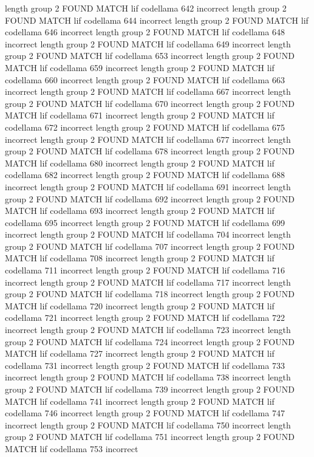 length group  2
FOUND MATCH lif codellama 642 incorrect
length group  2
FOUND MATCH lif codellama 644 incorrect
length group  2
FOUND MATCH lif codellama 646 incorrect
length group  2
FOUND MATCH lif codellama 648 incorrect
length group  2
FOUND MATCH lif codellama 649 incorrect
length group  2
FOUND MATCH lif codellama 653 incorrect
length group  2
FOUND MATCH lif codellama 659 incorrect
length group  2
FOUND MATCH lif codellama 660 incorrect
length group  2
FOUND MATCH lif codellama 663 incorrect
length group  2
FOUND MATCH lif codellama 667 incorrect
length group  2
FOUND MATCH lif codellama 670 incorrect
length group  2
FOUND MATCH lif codellama 671 incorrect
length group  2
FOUND MATCH lif codellama 672 incorrect
length group  2
FOUND MATCH lif codellama 675 incorrect
length group  2
FOUND MATCH lif codellama 677 incorrect
length group  2
FOUND MATCH lif codellama 678 incorrect
length group  2
FOUND MATCH lif codellama 680 incorrect
length group  2
FOUND MATCH lif codellama 682 incorrect
length group  2
FOUND MATCH lif codellama 688 incorrect
length group  2
FOUND MATCH lif codellama 691 incorrect
length group  2
FOUND MATCH lif codellama 692 incorrect
length group  2
FOUND MATCH lif codellama 693 incorrect
length group  2
FOUND MATCH lif codellama 695 incorrect
length group  2
FOUND MATCH lif codellama 699 incorrect
length group  2
FOUND MATCH lif codellama 704 incorrect
length group  2
FOUND MATCH lif codellama 707 incorrect
length group  2
FOUND MATCH lif codellama 708 incorrect
length group  2
FOUND MATCH lif codellama 711 incorrect
length group  2
FOUND MATCH lif codellama 716 incorrect
length group  2
FOUND MATCH lif codellama 717 incorrect
length group  2
FOUND MATCH lif codellama 718 incorrect
length group  2
FOUND MATCH lif codellama 720 incorrect
length group  2
FOUND MATCH lif codellama 721 incorrect
length group  2
FOUND MATCH lif codellama 722 incorrect
length group  2
FOUND MATCH lif codellama 723 incorrect
length group  2
FOUND MATCH lif codellama 724 incorrect
length group  2
FOUND MATCH lif codellama 727 incorrect
length group  2
FOUND MATCH lif codellama 731 incorrect
length group  2
FOUND MATCH lif codellama 733 incorrect
length group  2
FOUND MATCH lif codellama 738 incorrect
length group  2
FOUND MATCH lif codellama 739 incorrect
length group  2
FOUND MATCH lif codellama 741 incorrect
length group  2
FOUND MATCH lif codellama 746 incorrect
length group  2
FOUND MATCH lif codellama 747 incorrect
length group  2
FOUND MATCH lif codellama 750 incorrect
length group  2
FOUND MATCH lif codellama 751 incorrect
length group  2
FOUND MATCH lif codellama 753 incorrect
